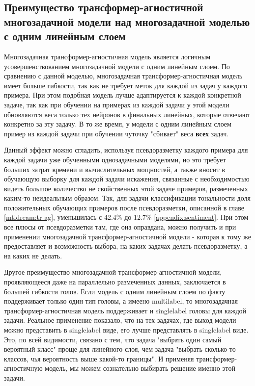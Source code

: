 \subsection{Преимущество трансформер-агностичной многозадачной модели над многозадачной моделью с одним линейным слоем} 
\label{ch:tr-ag:advantages}

Многозадачная трансформер-агностичная модель является логичным усовершенствованием многозадачной модели с одним линейным слоем. По сравнению с данной моделью, многозадачная трансформер-агностичная модель имеет больше гибкости, так как не требует меток для каждой из задач у каждого примера. При этом подобная модель лучше адаптируется к каждой конкретной задаче, так как при обучении на примерах из каждой задачи у этой модели обновляются веса только тех нейронов в финальных линейных, которые отвечают конкретно за эту задачу. В то же время, у модели с одним линейным слоем пример из каждой задачи при обучении чуточку "сбивает" веса \textbf{всех} задач. 

Данный эффект можно сгладить, используя псевдоразметку каждого примера для каждой задачи уже обученными однозадачными моделями, но это требует больших затрат времени и вычислительных мощностей, а также вносит в обучающую выборку для каждой задачи искажения, связанные с необходимостью видеть большое количество не свойственных этой задаче примеров, размеченных каким-то неидеальным образом. Так, для задачи классификации тональности доля положительных обучающих примеров после псевдоразметки, описанной в главе \ref{mtldream:tr-ag}, уменьшилась с 42.4\% до 12.7\% \ref{appendix:sentiment}. При этом все плюсы от псевдоразметки там, где она оправдана, можно получить и при применении многозадачной трансформер-агностичной модели - которая к тому же предоставляет и возможность выбора, на каких задачах делать псевдоразметку, а на каких не делать.

Другое преимущество многозадачной трансформер-агностичной модели, проявляющееся даже на параллельно размеченных данных, заключается в большей гибкости голов. Если модель с одним линейным слоем по факту поддерживает только один тип головы, а имеено multilabel, то многозадачная трансформер-агностичная модель поддерживает и singlelabel головы для каждой задачи. Реальное применение показало, что на тех задачах, где выход модели можно представить в singlelabel виде, его лучше представлять в singlelabel виде. Это, по всей видимости, связано с тем, что задача "выбрать один самый вероятный класс" проще для линейного слоя, чем задача "выбрать сколько-то классов, чья вероятность выше какой-то границы". И применяя трансформер-агностичную модель, мы можем сознательно выбирать решение именно этой задачи.


